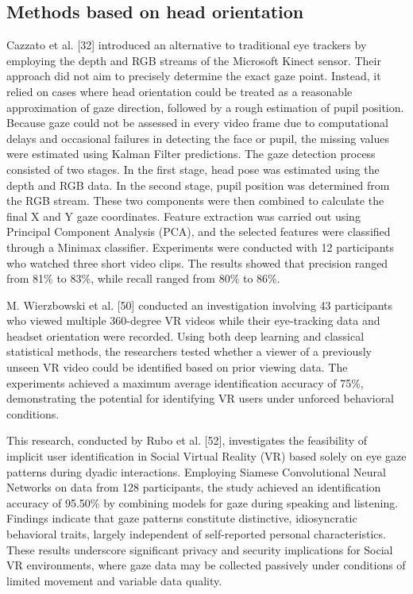 \documentclass{article}
\begin{document}
\subsection{Methods based on head orientation}

Cazzato et al. [32] introduced an alternative to traditional eye trackers by employing the depth and RGB streams of the Microsoft Kinect sensor.
Their approach did not aim to precisely determine the exact gaze point.
Instead, it relied on cases where head orientation could be treated as a reasonable approximation of gaze direction, followed by a rough estimation of pupil position.
Because gaze could not be assessed in every video frame due to computational delays and occasional failures in detecting the face or pupil, the missing values were estimated using Kalman Filter predictions. 
The gaze detection process consisted of two stages. In the first stage, head pose was estimated using the depth and RGB data. 
In the second stage, pupil position was determined from the RGB stream. 
These two components were then combined to calculate the final X and Y gaze coordinates. 
Feature extraction was carried out using Principal Component Analysis (PCA), and the selected features were classified through a Minimax classifier.
Experiments were conducted with 12 participants who watched three short video clips. 
The results showed that precision ranged from 81\% to 83\%, while recall ranged from 80\% to 86\%.

M. Wierzbowski et al. [50] conducted an investigation involving 43 participants who viewed multiple 360-degree VR videos while their eye-tracking data and headset orientation were recorded.
Using both deep learning and classical statistical methods, the researchers tested whether a viewer of a previously unseen VR video could be identified based on prior viewing data. 
The experiments achieved a maximum average identification accuracy of 75\%, demonstrating the potential for identifying VR users under unforced behavioral conditions.

This research, conducted by Rubo et al. [52], investigates the feasibility of implicit user identification in Social Virtual Reality (VR) based solely on eye gaze patterns during dyadic interactions.
Employing Siamese Convolutional Neural Networks on data from 128 participants, the study achieved an identification accuracy of 95.50\% by combining models for gaze during speaking and listening. 
Findings indicate that gaze patterns constitute distinctive, idiosyncratic behavioral traits, largely independent of self-reported personal characteristics.
These results underscore significant privacy and security implications for Social VR environments, where gaze data may be collected passively under conditions of limited movement and variable data quality.
\end{document}
